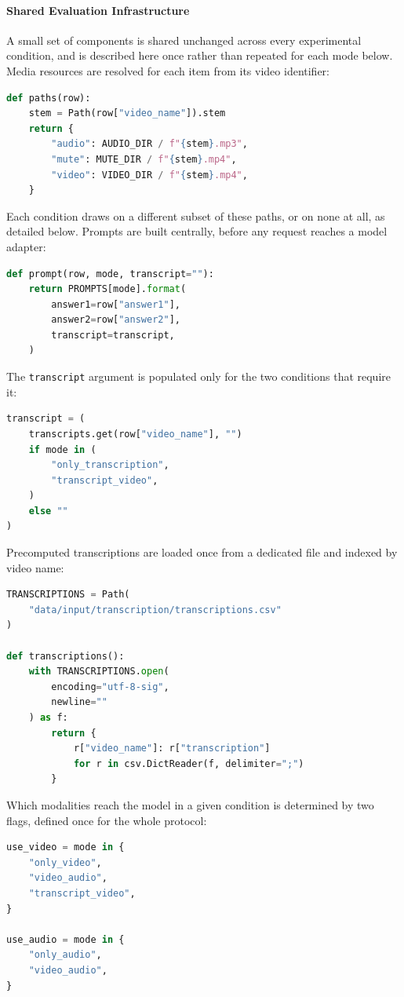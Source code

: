\paragraph{Shared Evaluation Infrastructure} A small set of components is shared unchanged across every experimental condition, and is described here once rather than repeated for each mode below.
Media resources are resolved for each item from its video identifier:
\begin{lstlisting}[language=Python]
def paths(row):
    stem = Path(row["video_name"]).stem
    return {
        "audio": AUDIO_DIR / f"{stem}.mp3",
        "mute": MUTE_DIR / f"{stem}.mp4",
        "video": VIDEO_DIR / f"{stem}.mp4",
    }
\end{lstlisting}
Each condition draws on a different subset of these paths, or on none at all, as detailed below.
Prompts are built centrally, before any request reaches a model adapter:
\begin{lstlisting}[language=Python]
def prompt(row, mode, transcript=""):
    return PROMPTS[mode].format(
        answer1=row["answer1"],
        answer2=row["answer2"],
        transcript=transcript,
    )
\end{lstlisting}
The \texttt{transcript} argument is populated only for the two conditions that require it:
\begin{lstlisting}[language=Python]
transcript = (
    transcripts.get(row["video_name"], "")
    if mode in (
        "only_transcription",
        "transcript_video",
    )
    else ""
)
\end{lstlisting}
Precomputed transcriptions are loaded once from a dedicated file and indexed by video name:
\begin{lstlisting}[language=Python]
TRANSCRIPTIONS = Path(
    "data/input/transcription/transcriptions.csv"
)

def transcriptions():
    with TRANSCRIPTIONS.open(
        encoding="utf-8-sig",
        newline=""
    ) as f:
        return {
            r["video_name"]: r["transcription"]
            for r in csv.DictReader(f, delimiter=";")
        }
\end{lstlisting}
Which modalities reach the model in a given condition is determined by two flags, defined once for the whole protocol:
\begin{lstlisting}[language=Python]
use_video = mode in {
    "only_video",
    "video_audio",
    "transcript_video",
}

use_audio = mode in {
    "only_audio",
    "video_audio",
}
\end{lstlisting}
